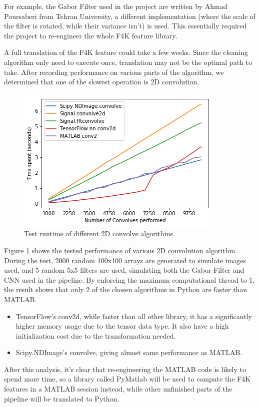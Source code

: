 \documentclass[bsc,logo,twoside,fullspacing,parskip]{infthesis}
\begin{document}
For example, the Gabor Filter used in the project are written by Ahmad Poursaberi from Tehran University, a different implementation (where the scale of the filter is rotated, while their variance isn't) is used. 
This essentially required the project to re-engineer the whole F4K feature library.

A full translation of the F4K feature could take a few weeks. Since the cleaning algorithm only need to execute once, translation may not be the optimal path to take. After recording performance on various parts of the algorithm, we determined that one of the slowest operation is 2D convolution.

\begin{figure}[h]
    \centering
    \includegraphics[scale=0.5]{graph/benchmark.png}
    \caption{Test runtime of different 2D convolve algorithms.}
    \label{fig:benchmark}
\end{figure}

Figure \ref{fig:benchmark} shows the tested performance of various 2D convolution algorithm. During the test, 2000 random 100x100 arrays are generated to simulate images used, and 5 random 5x5 filters are used, simulating both the Gabor Filter and CNN used in the pipeline. By enforcing the maximum computational thread to 1, the result shows that only 2 of the chosen algorithms in Python are faster than MATLAB.
\begin{itemize}
\item
TensorFlow's conv2d, while faster than all other library, it has a significantly higher memory usage due to the tensor data type. It also have a high initialization cost due to the transformation needed.
\item
Scipy.NDImage's convolve, giving almost same performance as MATLAB.
\end{itemize}

After this analysis, it's clear that re-engineering the MATLAB code is likely to spend more time, so a library called PyMatlab will be used to compute the F4K features in a MATLAB session instead, while other unfinished parts of the pipeline will be translated to Python.
\end{document}
